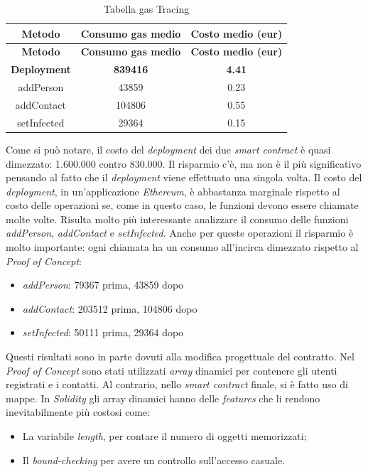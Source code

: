 \begin{center}
	\begin{longtable}{| c | c | c |}
		\caption{Tabella gas Tracing}
		\label{tab:gas-tracing}\\
		\hline
		\textbf{Metodo} & \textbf{Consumo gas medio} & \textbf{Costo medio (eur)}\\
		\endfirsthead
		\hline
		\textbf{Metodo} & \textbf{Consumo gas medio} & \textbf{Costo medio (eur)}\\
		\endhead
		\textbf{Deployment} & \textbf{839416} & \textbf{4.41}\\
		\hline
		\endfoot
		
		\hline
		addPerson & 43859 & 0.23\\
		\hline
		addContact & 104806 & 0.55\\
		\hline
		setInfected & 29364 & 0.15\\
		\hline
	\end{longtable}
\end{center}

Come si può notare, il costo del \textit{deployment} dei due \textit{smart contract} è quasi dimezzato: 1.600.000 contro 830.000. Il risparmio c'è, ma non è il più significativo pensando al fatto che il \textit{deployment} viene effettuato una singola volta. Il costo del \textit{deployment}, in un'applicazione \textit{Ethereum}, è abbastanza marginale rispetto al costo delle operazioni se, come in questo caso, le funzioni devono essere chiamate molte volte.
Risulta molto più interessante analizzare il consumo delle funzioni \textit{addPerson}, \textit{addContact} e \textit{setInfected}. Anche per queste operazioni il risparmio è molto importante: ogni chiamata ha un consumo all'incirca dimezzato rispetto al \textit{Proof of Concept}:
\begin{itemize}
\item{\textit{addPerson}: 79367 prima, 43859 dopo}
\item{\textit{addContact}: 203512 prima, 104806 dopo}
\item{\textit{setInfected}: 50111 prima, 29364 dopo}
\end{itemize}

Questi risultati sono in parte dovuti alla modifica progettuale del contratto. Nel \textit{Proof of Concept} sono stati utilizzati \textit{array} dinamici per contenere gli utenti registrati e i contatti. Al contrario, nello \textit{smart contract} finale, si è fatto uso di mappe. In \textit{Solidity} gli array dinamici hanno delle \textit{features} che li rendono inevitabilmente più costosi come: 
\begin{itemize}
\item{La variabile \textit{length}, per contare il numero di oggetti memorizzati;}
\item{Il \textit{bound-checking} per avere un controllo sull'accesso casuale.}
\end{itemize}

